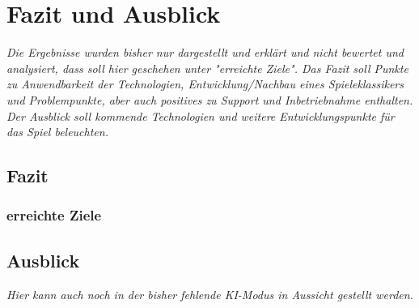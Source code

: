 
\chapter{Fazit und Ausblick}
\label{cha:fazit}

\emph{Die Ergebnisse wurden bisher nur dargestellt und erklärt und nicht bewertet und analysiert, dass soll hier geschehen unter "erreichte Ziele". Das Fazit soll Punkte zu Anwendbarkeit der Technologien, Entwicklung/Nachbau eines Spieleklassikers und Problempunkte, aber auch positives zu Support und Inbetriebnahme enthalten. Der Ausblick soll kommende Technologien und weitere Entwicklungspunkte für das Spiel beleuchten.}

\section{Fazit}
\label{sec:Schlussfolgerung}

\subsection{erreichte Ziele}
\label{subsec:erreichte_ziele}

\section{Ausblick}
\label{sec:Ausblick}

\emph{Hier kann auch noch in der bisher fehlende KI-Modus in Aussicht gestellt werden.}
